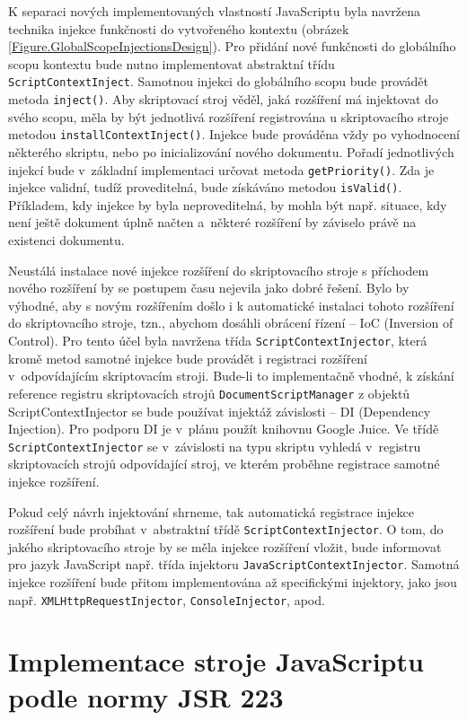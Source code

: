 K separaci nových implementovaných vlastností JavaScriptu byla navržena technika injekce funkčnosti do vytvořeného kontextu (obrázek \ref{Figure.GlobalScopeInjectionsDesign}). Pro přidání nové funkčnosti do globálního scopu kontextu bude nutno implementovat abstraktní třídu \texttt{ScriptContextInject}. Samotnou injekci do globálního scopu bude provádět metoda \texttt{inject()}. Aby skriptovací stroj věděl, jaká rozšíření má injektovat do svého scopu, měla by být jednotlivá rozšíření registrována u skriptovacího stroje metodou \texttt{installContextInject()}. Injekce bude prováděna vždy po vyhodnocení některého skriptu, nebo po inicializování nového dokumentu. Pořadí jednotlivých injekcí bude v~základní implementaci určovat metoda \texttt{getPriority()}. Zda je injekce validní, tudíž proveditelná, bude získáváno metodou \texttt{isValid()}. Příkladem, kdy injekce by byla neproveditelná, by mohla být např. situace, kdy není ještě dokument úplně načten a~některé rozšíření by záviselo právě na existenci dokumentu.

Neustálá instalace nové injekce rozšíření do skriptovacího stroje s příchodem nového rozšíření by se postupem času nejevila jako dobré řešení. Bylo by výhodné, aby s novým rozšířením došlo i k automatické instalaci tohoto rozšíření do skriptovacího stroje, tzn., abychom dosáhli obrácení řízení -- IoC (Inversion of Control). Pro tento účel byla navržena třída \texttt{ScriptContextInjector}, která kromě metod samotné injekce bude provádět i registraci rozšíření v~odpovídajícím skriptovacím stroji. Bude-li to implementačně vhodné, k získání reference registru skriptovacích strojů \texttt{DocumentScriptManager} z objektů ScriptContextInjector se bude používat injektáž závislosti -- DI (Dependency Injection). Pro podporu DI je v~plánu použít knihovnu Google Juice. Ve třídě \texttt{ScriptContextInjector} se v~závislosti na typu skriptu vyhledá v~registru skriptovacích strojů odpovídající stroj, ve kterém proběhne registrace samotné injekce rozšíření. 

Pokud celý návrh injektování shrneme, tak automatická registrace injekce rozšíření bude probíhat v~abstraktní třídě \texttt{ScriptContextInjector}. O tom, do jakého skriptovacího stroje by se měla injekce rozšíření vložit, bude informovat pro jazyk JavaScript např. třída injektoru \texttt{JavaScriptContextInjector}. Samotná injekce rozšíření bude přitom implementována až specifickými injektory, jako jsou např. \texttt{XMLHttpRequestInjector}, \texttt{ConsoleInjector}, apod.

\section{Implementace stroje JavaScriptu podle normy JSR 223}
\label{Chapter.Design.JavaScriptEngineJSR223}

